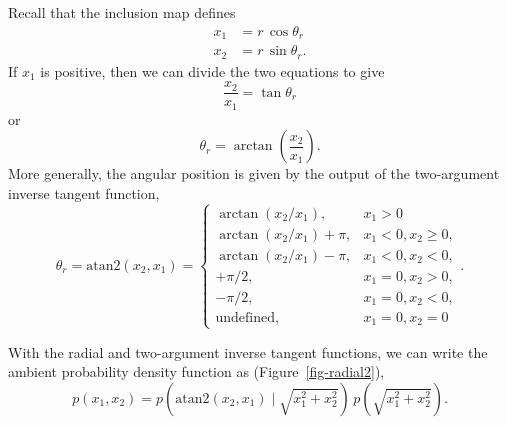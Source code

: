 \documentclass[
  letterpaper,
  DIV=11,
  numbers=noendperiod]{scrartcl}
\begin{document}
Recall that the inclusion map defines \begin{align*}
x_{1} &= r \, \cos \theta_{r}
\\
x_{2} &= r \, \sin \theta_{r}.
\end{align*} If \(x_{1}\) is positive, then we can divide the two
equations to give \[
\frac{ x_{2} }{ x_{1} }
=
\tan \theta_{r}
\] or \[
\theta_{r} = \arctan \left( \frac{ x_{2} }{ x_{1} } \right).
\] More generally, the angular position is given by the output of the
two-argument inverse tangent function, \[
\theta_{r}
=
\mathrm{atan2}(x_{2}, x_{1})
=
\left\{
\begin{array}{ll}
\arctan(x_{2} / x_{1}),       & x_{1} > 0           \\
\arctan(x_{2} / x_{1}) + \pi, & x_{1} < 0, x_{2} \ge 0, \\
\arctan(x_{2} / x_{1}) - \pi, & x_{1} < 0, x_{2} < 0,   \\
+ \pi / 2,                    & x_{1} = 0, x_{2} > 0,   \\
- \pi / 2,                    & x_{1} = 0, x_{2} < 0,   \\
\mathrm{undefined},           & x_{1} = 0, x_{2} = 0
\end{array}
\right. .
\]

With the radial and two-argument inverse tangent functions, we can write
the ambient probability density function as (Figure~\ref{fig-radial2}),
\[
p( x_{1}, x_{2} )
=
p( \mathrm{atan2}(x_{2}, x_{1}) \mid
   \sqrt{ x_{1}^{2} + x_{2}^{2} } ) \,
p( \sqrt{ x_{1}^{2} + x_{2}^{2} } ).
\]
\end{document}
